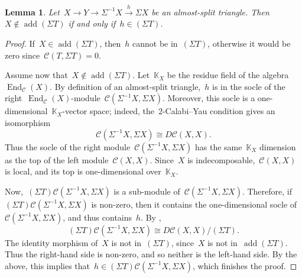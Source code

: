 \documentclass{amsart}
\newtheorem{lemma}[theorem]{Lemma}
\theoremstyle{definition}
\newcommand{\field}{\mathbb{K}}
\newcommand{\cat}{\mathcal{C}}
\newcommand{\susp}{\Sigma}
\newcommand{\add}{\operatorname{add}}
\newcommand{\End}[1]{\operatorname{End}_{#1}}
\begin{document}
\begin{lemma}
\label{lemm::almost-split}
 Let~$X\xrightarrow{} Y \xrightarrow{} \susp^{-1} X \xrightarrow{h} \susp X$ be an almost-split triangle.  Then~$X\notin \add(\susp T)$ if and only if~$h\in (\susp T)$.
\end{lemma}
\begin{proof}
 If~$X\in \add(\susp T)$, then~$h$ cannot be in~$(\susp T)$, otherwise it would be zero since~$\cat(T, \susp T) =0$.  
 
 Assume now that~$X\notin \add(\susp T)$.  Let~$\field_X$ be the residue field of the algebra~$\End{\cat}(X)$. 
 By definition of an almost-split triangle,~$h$ is in the socle of the right~$\End{\cat}(X)$-module~$\cat(\susp^{-1} X, \susp X)$.  Moreover, this socle is a one-dimensional~$\field_X$-vector space; indeed, the~$2$-Calabi--Yau condition gives an isomorphism
 \[
  \cat(\susp^{-1} X, \susp X) \cong D\cat(X, X).
 \]
 Thus the socle of the right module~$\cat(\susp^{-1} X, \susp X)$ has the same~$\field_X$ dimension as the top of the left module~$\cat(X,X)$.  Since~$X$ is indecomposable,~$\cat(X,X)$ is local, and its top is one-dimensional over~$\field_X$.
 
 Now,~$(\susp T)\cat(\susp^{-1} X, \susp X)$ is a sub-module of~$\cat(\susp^{-1} X, \susp X)$.  Therefore, if~$(\susp T)\cat(\susp^{-1} X, \susp X)$ is non-zero, then it contains the one-dimensional socle of~$\cat(\susp^{-1} X, \susp X)$, and thus contains~$h$.   
 By \cite{Palu},
 \[
  (\susp T)\cat(\susp^{-1} X, \susp X) \cong D\cat(X, X)/(\susp T). 
 \]
The identity morphism of~$X$ is not in~$(\susp T)$, since~$X$ is not in~$\add(\susp T)$.  Thus the right-hand side is non-zero, and so neither is the left-hand side.  By the above, this implies that~$h\in (\susp T)\cat(\susp^{-1} X, \susp X)$, which finishes the proof.
\end{proof}
\end{document}
